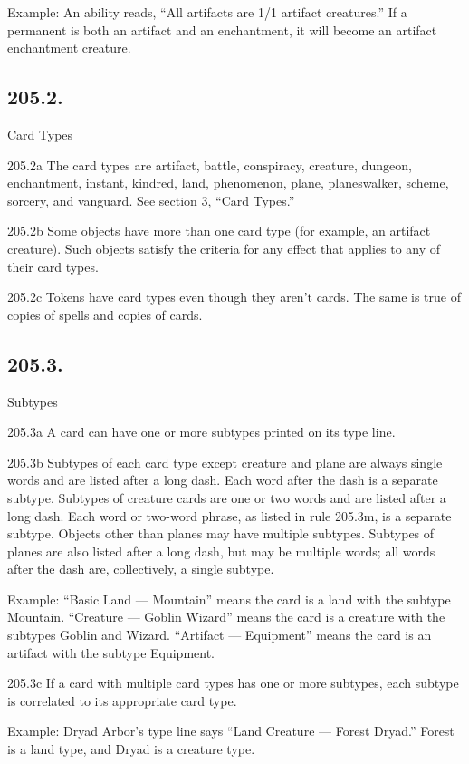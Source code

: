 Example: An ability reads, “All artifacts are 1/1 artifact creatures.” If a permanent is both an artifact and an enchantment, it will become an artifact enchantment creature.

\subsection*{205.2.}
Card Types

205.2a The card types are artifact, battle, conspiracy, creature, dungeon, enchantment, instant, kindred, land, phenomenon, plane, planeswalker, scheme, sorcery, and vanguard. See section 3, “Card Types.”

205.2b Some objects have more than one card type (for example, an artifact creature). Such objects satisfy the criteria for any effect that applies to any of their card types.

205.2c Tokens have card types even though they aren’t cards. The same is true of copies of spells and copies of cards.

\subsection*{205.3.}
Subtypes

205.3a A card can have one or more subtypes printed on its type line.

205.3b Subtypes of each card type except creature and plane are always single words and are listed after a long dash. Each word after the dash is a separate subtype. Subtypes of creature cards are one or two words and are listed after a long dash. Each word or two-word phrase, as listed in rule 205.3m, is a separate subtype. Objects other than planes may have multiple subtypes. Subtypes of planes are also listed after a long dash, but may be multiple words; all words after the dash are, collectively, a single subtype.

Example: “Basic Land — Mountain” means the card is a land with the subtype Mountain. “Creature — Goblin Wizard” means the card is a creature with the subtypes Goblin and Wizard. “Artifact — Equipment” means the card is an artifact with the subtype Equipment.

205.3c If a card with multiple card types has one or more subtypes, each subtype is correlated to its appropriate card type.

Example: Dryad Arbor’s type line says “Land Creature — Forest Dryad.” Forest is a land type, and Dryad is a creature type.

